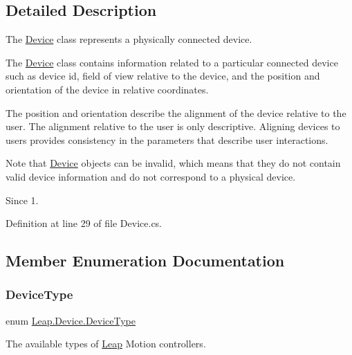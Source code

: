 \subsection{Detailed Description}
The \mbox{\hyperlink{class_leap_1_1_device}{Device}} class represents a physically connected device. 

The \mbox{\hyperlink{class_leap_1_1_device}{Device}} class contains information related to a particular connected device such as device id, field of view relative to the device, and the position and orientation of the device in relative coordinates.

The position and orientation describe the alignment of the device relative to the user. The alignment relative to the user is only descriptive. Aligning devices to users provides consistency in the parameters that describe user interactions.

Note that \mbox{\hyperlink{class_leap_1_1_device}{Device}} objects can be invalid, which means that they do not contain valid device information and do not correspond to a physical device. \begin{DoxySince}{Since}
1. 
\end{DoxySince}


Definition at line 29 of file Device.\+cs.



\subsection{Member Enumeration Documentation}
\mbox{\label{class_leap_1_1_device_acbae26ae873dec763876ed257b38456f}} 
\subsubsection{\texorpdfstring{DeviceType}{DeviceType}}
{\footnotesize\ttfamily enum \mbox{\hyperlink{class_leap_1_1_device_acbae26ae873dec763876ed257b38456f}{Leap.\+Device.\+Device\+Type}}\hspace{0.3cm}{\ttfamily [strong]}}



The available types of \mbox{\hyperlink{namespace_leap}{Leap}} Motion controllers. 

